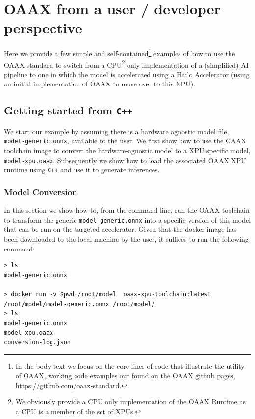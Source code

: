\documentclass{article}
\newcommand{\oaaxgit}{\href{https://github.com/oaax-standard}{https://github.com/oaax-standard}}
\begin{document}
\section{OAAX from a user / developer perspective}

Here we provide a few simple and self-contained\footnote{In the body text we focus on the core lines of code that illustrate the utility of OAAX, working code examples our found on the OAAX github pages, \oaaxgit.} examples of how to use the OAAX standard to switch from a CPU\footnote{We obviously provide a CPU only implementation of the OAAX Runtime as a CPU is a member of the set of XPUs.} only implementation of a (simplified) AI pipeline to one in which the model is accelerated using a Hailo Accelerator (using an initial implementation of OAAX to move over to this XPU). %

\subsection{Getting started from \texttt{C++}}

We start our example by assuming there is a hardware agnostic model file, \texttt{model-generic.onnx}, available to the user. We first show how to use the OAAX toolchain image to convert the hardware-agnostic model to a XPU specific model, \texttt{model-xpu.oaax}. Subsequently we show how to load the associated OAAX XPU runtime using \texttt{C++} and use it to generate inferences.

\subsubsection{Model Conversion}

In this section we show how to, from the command line, run the OAAX toolchain to transform the generic \texttt{model-generic.onnx} into a specific version of this model that can be run on the targeted accelerator. Given that the docker image has been downloaded to the local machine by the user, it suffices to run the following command:

\begin{lstlisting}
> ls
model-generic.onnx

> docker run -v $pwd:/root/model  oaax-xpu-toolchain:latest /root/model/model-generic.onnx /root/model/
> ls
model-generic.onnx
model-xpu.oaax
conversion-log.json
\end{lstlisting}
\end{document}

